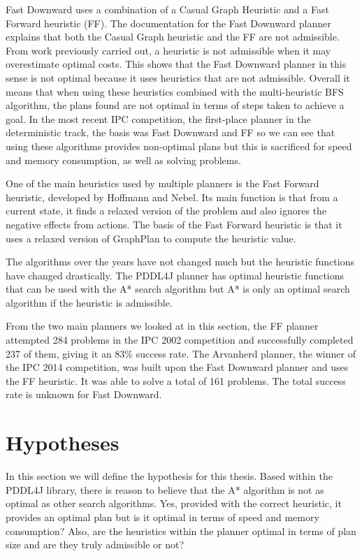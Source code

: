 Fast Downward uses a combination of a Casual Graph Heuristic and a Fast Forward heuristic (FF). The documentation for the Fast Downward planner \cite{FDownwardDoc} explains that both the Casual Graph heuristic and the FF are not admissible. From work previously carried out, a heuristic is not admissible when it may overestimate optimal costs.\cite{Pearl}\cite{Nilson} \cite{AdmissibleHeuristic} This shows that the Fast Downward planner in this sense is not optimal because it uses heuristics that are not admissible. Overall it means that when using these heuristics combined with the multi-heuristic BFS algorithm, the plans found are not optimal in terms of steps taken to achieve a goal. 
In the most recent IPC competition, the first-place planner in the deterministic track, the basis was Fast Downward and FF so we can see that using these algorithms provides non-optimal plans but this is sacrificed for speed and memory consumption, as well as solving problems. 

One of the main heuristics used by multiple planners is the Fast Forward heuristic, developed by Hoffmann and Nebel\cite{FFPlanningSystem}. Its main function is that from a current state, it finds a relaxed version of the problem and also ignores the negative effects from actions. The basis of the Fast Forward heuristic is that it uses a relaxed version of GraphPlan to compute the heuristic value. 

The algorithms over the years have not changed much but the heuristic functions have changed drastically. The PDDL4J planner has optimal heuristic functions that can be used with the A* search algorithm but A* is only an optimal search algorithm if the heuristic is admissible. 

From the two main planners we looked at in this section, the FF planner attempted 284 problems in the IPC 2002 competition and successfully completed 237 of them, giving it an 83\% success rate. The Arvanherd planner, the winner of the IPC 2014 competition, was built upon the Fast Downward planner and uses the FF heuristic. It was able to solve a total of 161 problems\cite{ArvandHerd}. The total success rate is unknown for Fast Downward.  
\section{Hypotheses}
In this section we will define the hypothesis for this thesis. Based within the PDDL4J library, there is reason to believe that the A* algorithm is not as optimal as other search algorithms. Yes, provided with the correct heuristic, it provides an optimal plan but is it optimal in terms of speed and memory consumption? Also, are the heuristics within the planner optimal in terms of plan size and are they truly admissible or not?

